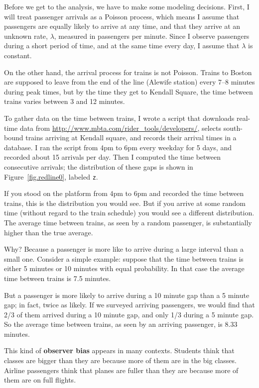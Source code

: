 \documentclass[12pt]{book}
\begin{document}
Before we get to the analysis, we have to make some
modeling decisions.  First, I will treat passenger arrivals as
a Poisson process, which means I assume that passengers are equally
likely to arrive at any time, and that they arrive at an unknown
rate, $\lambda$, measured in passengers per minute.  Since I
observe passengers during a short period of time, and at the same
time every day, I assume that $\lambda$ is constant.

On the other hand, the arrival process for trains is not Poisson.
Trains to Boston are supposed to leave from the end of the line
(Alewife station) every 7--8 minutes during peak times, but by the time
they get to Kendall Square, the time between trains varies between 3
and 12 minutes.

To gather data on the time between trains, I wrote a script that
downloads real-time data from
\url{http://www.mbta.com/rider_tools/developers/}, selects south-bound
trains arriving at Kendall square, and records their arrival times
in a database.  I ran the script from 4pm to 6pm every weekday
for 5 days, and recorded about 15 arrivals per day.  Then
I computed the time between consecutive arrivals; the distribution
of these gaps is shown in Figure~\ref{fig.redline0}, labeled {\tt z}.

If you stood on the platform from 4pm to 6pm and recorded the time
between trains, this is the distribution you would see.  But if you
arrive at some random time (without regard to the train schedule) you
would see a different distribution.  The average time
between trains, as seen by a random passenger, is substantially
higher than the true average.

Why?  Because a passenger is more like to arrive during a
large interval than a small one.  Consider a simple example:
suppose that the time between trains is either 5 minutes
or 10 minutes with equal probability.  In that case
the average time between
trains is 7.5 minutes.

But a passenger is more likely to arrive during a 10 minute gap 
than a 5 minute gap; in fact, twice as likely.  If we surveyed
arriving passengers, we would find that 2/3 of them arrived during
a 10 minute gap, and only 1/3 during a 5 minute gap.  So the
average time between trains, as seen by an arriving passenger,
is 8.33 minutes.

This kind of {\bf observer bias} appears in many contexts.  Students
think that classes are bigger than they are because more of them are
in the big classes.  Airline passengers think that planes are fuller
than they are because more of them are on full flights.
\end{document}
